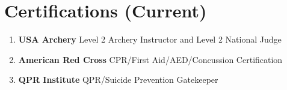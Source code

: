 \documentclass[letterpaper,11pt]{article}
\begin{document}



\section{Certifications (Current)}
\vspace{9pt}
\begin{enumerate}
    \item \textbf{USA Archery} Level 2 Archery Instructor and Level 2 National Judge
    \item \textbf{American Red Cross} CPR/First Aid/AED/Concussion Certification
    \item \textbf{QPR Institute} QPR/Suicide Prevention Gatekeeper
\end{enumerate}

\end{document}
